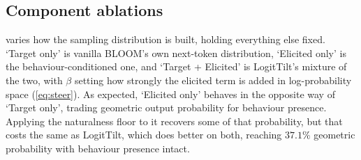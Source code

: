 \documentclass{article}
\begin{document}









\subsection{Component ablations}

 varies how the sampling distribution is built, holding everything else fixed. `Target only' is vanilla BLOOM's own next-token distribution, `Elicited only' is the behaviour-conditioned one, and `Target + Elicited' is LogitTilt's mixture of the two, with $\beta$ setting how strongly the elicited term is added in log-probability space (\cref{eq:steer}). As expected, `Elicited only' behaves in the opposite way of `Target only', trading geometric output probability for behaviour presence. Applying the naturalness floor to it recovers some of that probability, but that costs the same as LogitTilt, which does better on both, reaching $37.1\%$ geometric probability with behaviour presence intact.
\end{document}
